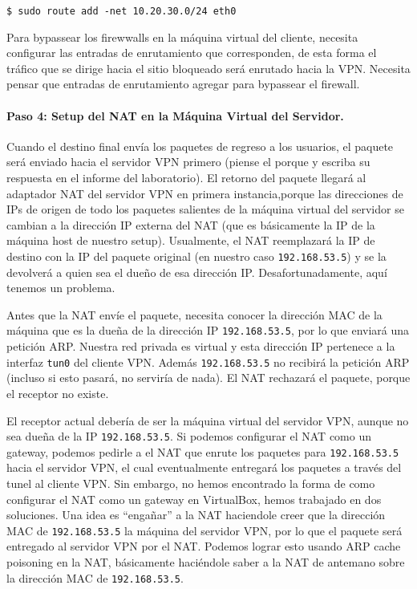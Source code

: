 \begin{lstlisting}
$ sudo route add -net 10.20.30.0/24 eth0
\end{lstlisting}

Para bypassear los firewwalls en la máquina virtual del cliente, necesita configurar las entradas de enrutamiento que corresponden, de esta forma el tráfico que se dirige hacia el sitio bloqueado será enrutado hacia la VPN. Necesita pensar que entradas de enrutamiento agregar para bypassear el firewall.



\paragraph{Paso 4: Setup del NAT en la Máquina Virtual del Servidor.}
Cuando el destino final envía los paquetes de regreso a los usuarios, el paquete será enviado hacia el servidor VPN primero (piense el porque y escriba su respuesta en el informe del laboratorio). El retorno del paquete llegará al adaptador NAT del servidor VPN en primera instancia,porque las direcciones de IPs de origen de todo los paquetes salientes de la máquina virtual del servidor se cambian a la dirección IP externa del NAT (que es básicamente la IP de la máquina host de nuestro setup). Usualmente, el NAT reemplazará la IP de destino con la IP del paquete original (en nuestro caso \texttt{192.168.53.5}) y se la devolverá a quien sea el dueño de esa dirección IP. Desafortunadamente, aquí tenemos un problema.

Antes que la NAT envíe el paquete, necesita conocer la dirección MAC de la máquina que es la dueña de la dirección IP \texttt{192.168.53.5}, por lo que enviará una petición ARP. Nuestra red privada es virtual y esta dirección IP pertenece a la interfaz \texttt{tun0} del cliente VPN.
Además \texttt{192.168.53.5} no recibirá la petición ARP (incluso si esto pasará, no serviría de nada). El NAT rechazará el paquete, porque el receptor no existe.

El receptor actual debería de ser la máquina virtual del servidor VPN, aunque no sea dueña de la IP \texttt{192.168.53.5}. Si podemos configurar el NAT como un gateway, podemos pedirle a el NAT que enrute los paquetes para \texttt{192.168.53.5}  hacia el servidor VPN, el cual eventualmente entregará los paquetes a través del tunel al cliente VPN. Sin embargo, no hemos encontrado la forma de como configurar el NAT como un gateway en VirtualBox, hemos trabajado en dos soluciones.
Una idea es ``engañar'' a la NAT haciendole creer que la dirección MAC de \texttt{192.168.53.5} la máquina del servidor VPN, por lo que el paquete será entregado al servidor VPN por el NAT. Podemos lograr esto usando ARP cache poisoning en la NAT, básicamente haciéndole saber a la NAT de antemano sobre la dirección MAC de \texttt{192.168.53.5}.


